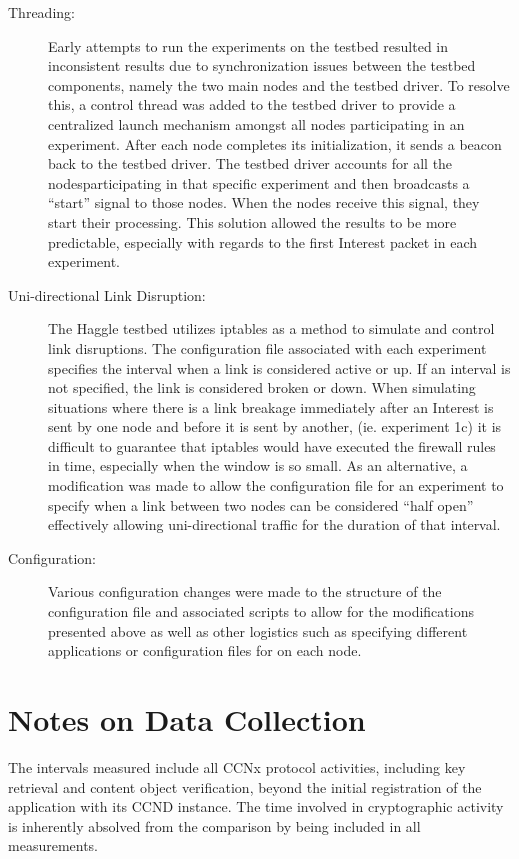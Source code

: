 \documentclass[a4paper,12pt]{report}      %
\begin{document}
\begin{description}
\item[Threading:] Early attempts to run the experiments on the testbed resulted in inconsistent results due to
synchronization issues between the testbed components, namely the two main nodes and the testbed
driver. To resolve this, a control thread was added to the testbed driver to provide a centralized launch
mechanism amongst all nodes participating in an experiment. After each node completes its
initialization, it sends a beacon back to the testbed driver. The testbed driver accounts for all the nodesparticipating in that specific experiment and then broadcasts a “start” signal to those nodes. When the
nodes receive this signal, they start their processing. This solution allowed the results to be more
predictable, especially with regards to the first Interest packet in each experiment.

\item[Uni-directional Link Disruption:] The Haggle testbed utilizes iptables as a method to simulate and
control link disruptions. The configuration file associated with each experiment specifies the interval
when a link is considered active or up. If an interval is not specified, the link is considered broken or
down. When simulating situations where there is a link breakage immediately after an Interest is sent
by one node and before it is sent by another, (ie. experiment 1c) it is difficult to guarantee that iptables
would have executed the firewall rules in time, especially when the window is so small. As an
alternative, a modification was made to allow the configuration file for an experiment to specify when
a link between two nodes can be considered “half open” effectively allowing uni-directional traffic for
the duration of that interval.

\item[Configuration:] Various configuration changes were made to the structure of the configuration file and
associated scripts to allow for the modifications presented above as well as other logistics such as
specifying different applications or configuration files for on each node.
\end{description}

\section{Notes on Data Collection}
The intervals measured include all CCNx protocol activities, including key retrieval and content object
verification, beyond the initial registration of the application with its CCND instance. The time
involved in cryptographic activity is inherently absolved from the comparison by being included in all
measurements.
\end{document}
